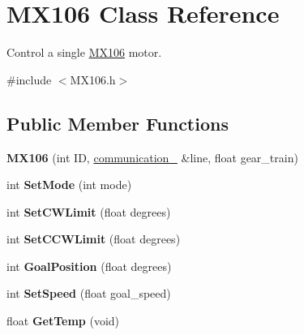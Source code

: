 \hypertarget{class_m_x106}{}\section{M\+X106 Class Reference}
\label{class_m_x106}


Control a single \hyperlink{class_m_x106}{M\+X106} motor.  




{\ttfamily \#include $<$M\+X106.\+h$>$}

\subsection*{Public Member Functions}
\begin{DoxyCompactItemize}
\item 
{\bfseries M\+X106} (int ID, \hyperlink{classcommunication__1}{communication\+\_} \&line, float gear\+\_\+train)\hypertarget{class_m_x106_ac413364acbcb66c88315d418a5be7d8e}{}\label{class_m_x106_ac413364acbcb66c88315d418a5be7d8e}

\item 
int {\bfseries Set\+Mode} (int mode)\hypertarget{class_m_x106_a7de70ad947eebbe398e4fcf18222a8de}{}\label{class_m_x106_a7de70ad947eebbe398e4fcf18222a8de}

\item 
int {\bfseries Set\+C\+W\+Limit} (float degrees)\hypertarget{class_m_x106_a1ac021a9b34ba0970529bee8ae4e168f}{}\label{class_m_x106_a1ac021a9b34ba0970529bee8ae4e168f}

\item 
int {\bfseries Set\+C\+C\+W\+Limit} (float degrees)\hypertarget{class_m_x106_a86db972dd474db642a008625bebef821}{}\label{class_m_x106_a86db972dd474db642a008625bebef821}

\item 
int {\bfseries Goal\+Position} (float degrees)\hypertarget{class_m_x106_afafe22d441e2073dea60acda999cc245}{}\label{class_m_x106_afafe22d441e2073dea60acda999cc245}

\item 
int {\bfseries Set\+Speed} (float goal\+\_\+speed)\hypertarget{class_m_x106_ab347df7137e25c8a31d7c6b0c412ed76}{}\label{class_m_x106_ab347df7137e25c8a31d7c6b0c412ed76}

\item 
float {\bfseries Get\+Temp} (void)\hypertarget{class_m_x106_a550761cebd3a9571f0ad001baace5157}{}\label{class_m_x106_a550761cebd3a9571f0ad001baace5157}

\end{DoxyCompactItemize}


